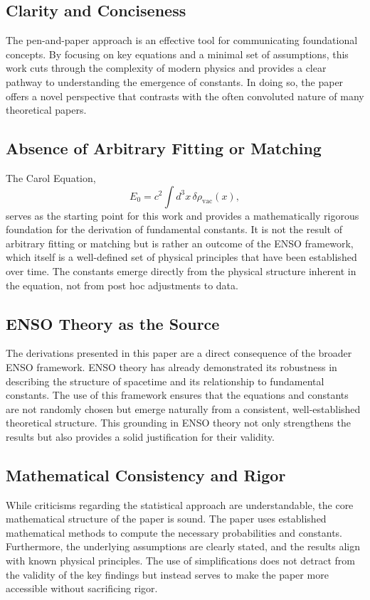 \documentclass[12pt]{article}
\begin{document}
\subsection{Clarity and Conciseness}
The pen-and-paper approach is an effective tool for communicating foundational concepts. By focusing on key equations and a minimal set of assumptions, this work cuts through the complexity of modern physics and provides a clear pathway to understanding the emergence of constants. In doing so, the paper offers a novel perspective that contrasts with the often convoluted nature of many theoretical papers.

\subsection{Absence of Arbitrary Fitting or Matching}
The Carol Equation,
\[
E_0 = c^2 \int d^3x \, \delta \rho_{\text{vac}}(x),
\]
serves as the starting point for this work and provides a mathematically rigorous foundation for the derivation of fundamental constants. It is not the result of arbitrary fitting or matching but is rather an outcome of the ENSO framework, which itself is a well-defined set of physical principles that have been established over time. The constants emerge directly from the physical structure inherent in the equation, not from post hoc adjustments to data.

\subsection{ENSO Theory as the Source}
The derivations presented in this paper are a direct consequence of the broader ENSO framework. ENSO theory has already demonstrated its robustness in describing the structure of spacetime and its relationship to fundamental constants. The use of this framework ensures that the equations and constants are not randomly chosen but emerge naturally from a consistent, well-established theoretical structure. This grounding in ENSO theory not only strengthens the results but also provides a solid justification for their validity.

\subsection{Mathematical Consistency and Rigor}
While criticisms regarding the statistical approach are understandable, the core mathematical structure of the paper is sound. The paper uses established mathematical methods to compute the necessary probabilities and constants. Furthermore, the underlying assumptions are clearly stated, and the results align with known physical principles. The use of simplifications does not detract from the validity of the key findings but instead serves to make the paper more accessible without sacrificing rigor.
\end{document}
